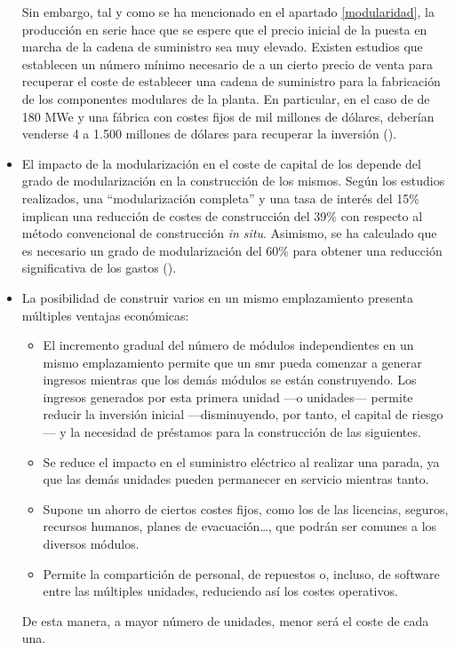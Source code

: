 \begin{itemize}
  Sin embargo, tal y como se ha mencionado en el apartado \ref{modularidad}, la producción en serie hace que se espere que el precio inicial de la puesta en marcha de la cadena de suministro sea muy elevado. Existen estudios que establecen un número mínimo necesario de  a un cierto precio de venta para recuperar el coste de establecer una cadena de suministro para la fabricación de los componentes modulares de la planta. En particular, en el caso de  de 180 MWe y una fábrica con costes fijos de mil millones de dólares, deberían venderse 4  a 1.500 millones de dólares para recuperar la inversión (\cite{overview_smrs}).

  \item El impacto de la modularización en el coste de capital de los  depende del grado de modularización en la construcción de los mismos. Según los estudios realizados, una ``modularización completa'' y una tasa de interés del 15\% implican una reducción de costes de construcción del 39\% con respecto al método convencional de construcción \emph{in situ}. Asimismo, se ha calculado que es necesario un grado de modularización del 60\% para obtener una reducción significativa de los gastos (\cite{maronati2016total}).
  
  \item La posibilidad de construir varios  en un mismo emplazamiento presenta múltiples ventajas económicas:
  
  \begin{itemize}
    \item El incremento gradual del número de módulos independientes en un mismo emplazamiento permite que un \acrshort{smr} pueda comenzar a generar ingresos mientras que los demás módulos se están construyendo. Los ingresos generados por esta primera unidad ---o unidades--- permite reducir la inversión inicial ---disminuyendo, por tanto, el capital de riesgo--- y la necesidad de préstamos para la construcción de las siguientes.
    \item Se reduce el impacto en el suministro eléctrico al realizar una parada, ya que las demás unidades pueden permanecer en servicio mientras tanto.
    \item Supone un ahorro de ciertos costes fijos, como los de las licencias, seguros, recursos humanos, planes de evacuación\dots, que podrán ser comunes a los diversos módulos.
    \item Permite la compartición de personal, de repuestos o, incluso, de software entre las múltiples unidades, reduciendo así los costes operativos.
  \end{itemize}
  De esta manera, a mayor número de unidades, menor será el coste de cada una.


\end{itemize}
